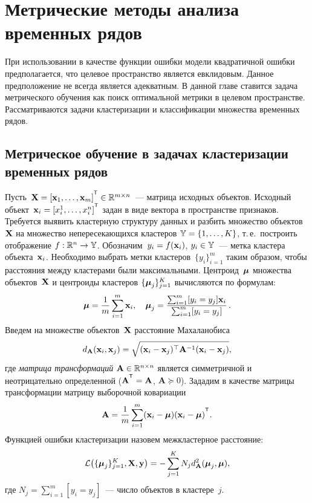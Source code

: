 \chapter{Метрические методы анализа временных рядов}
\label{ch:metric_learning}

При использовании в качестве функции ошибки модели квадратичной ошибки предполагается, что целевое пространство является евклидовым. 
Данное предположение не всегда является адекватным.
В данной главе ставится задача метрического обучения как поиск оптимальной метрики в целевом пространстве.
Рассматриваются задачи кластеризации и классификации множества временных рядов.

\section{Метрическое обучение в задачах кластеризации временных рядов}
\label{sec:ch5:metric_learning_clustering}

Пусть~$\bX = [\bx_1, \dots, \bx_m]^{\T} \in \mathbb{R}^{m \times n}$~--- матрица исходных объектов.
Исходный объект~$\bx_i = [x_i^1, \ldots, x_i^n]^{\T}$ задан в виде вектора в пространстве признаков.
Требуется выявить кластерную структуру данных и разбить множество объектов~$\mathbf{X}$ на множество непересекающихся кластеров $\mathbb{Y} = \{1, \dots, K\}$, т.\,е.\ построить отображение $f: \mathbb{R}^n \to \mathbb{Y}$.
Обозначим~$y_i = f (\mathbf{x}_i)$, $y_i \in \mathbb{Y}$~--- метка кластера объекта~$\mathbf{x}_i$.
Необходимо выбрать метки кластеров~$\{y_i\}_{i=1}^m$ таким образом, чтобы расстояния между кластерами были максимальными.
Центроид~$\boldsymbol{\mu}$ множества объектов~$\mathbf{X}$ и центроиды кластеров $\{\boldsymbol{\mu}_j\}_{j=1}^K$ вычисляются по формулам:
\begin{equation}
	\label{ch5:eq:mu}
	\boldsymbol{\mu} =\frac{1}{m} \sum_{i=1}^m\mathbf{x}_i, \quad
	\boldsymbol{\mu}_j =\frac{ \sum_{i=1}^m [y_i = y_j]\mathbf{x}_i } {\sum_{i=1}^m [y_i = y_j]}\,.
\end{equation}
Введем на множестве объектов~$\mathbf{X}$ расстояние Махаланобиса
\begin{equation}
	d_{\mathbf{A}} (\mathbf{x}_i, \mathbf{x}_j) = \sqrt{(\mathbf{x}_i - \mathbf{x}_j)^{\top} \mathbf{A}^{-1} (\mathbf{x}_i - \mathbf{x}_j)},
	\label{ch5:eq:mahal_distance}
\end{equation}
где \textit{матрица трансформаций} $\mathbf{A} \in \mathbb{R}^{n \times n}$ является симметричной и неотрицательно определенной ($\mathbf{A}^{\T} = \mathbf{A}$, $\mathbf{A} \succeq 0$).
Зададим в качестве матрицы трансформации матрицу выборочной ковариации
\begin{equation}
	\label{ch5:eq:covMatrix}
	\bA = \frac{1}{m} \sum_{i=1}^m(\bx_i - \bmu)(\bx_i - \bmu)^{\T}.
\end{equation}
Функцией ошибки кластеризации назовем межкластерное расстояние:
\begin{equation}
	\mathcal{L} \bigl(\{\boldsymbol{\mu}_j\}_{j=1}^K, \mathbf{X}, \mathbf{y}\bigr)= - \sum_{j=1}^K N_j d_{\mathbf{A}}^2(\boldsymbol{\mu}_j, \boldsymbol{\mu}),
	\label{ch5:eq:cluster_error_function}
\end{equation}
где $N_j = \sum_{i=1}^m [y_i = y_j]$~--- число объектов в кластере~$j$.


